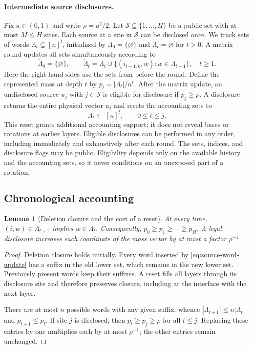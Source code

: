 \documentclass[11pt,letterpaper]{article}
\newtheorem{lemma}[theorem]{Lemma}
\theoremstyle{definition}
\theoremstyle{remark}
\begin{document}
\paragraph{Intermediate source disclosures.}
Fix $a\in(0,1)$ and write $\rho=a^2/2$.  Let
$\mathcal S\subseteq\{1,\ldots,H\}$ be a public set with at most
$M\leq H$ sites.  Each source at a site in $\mathcal S$ can be
disclosed once.  We track sets of words
$\Lambda_t\subseteq[n]^t$, initialized by
$\Lambda_0=\{\varnothing\}$ and $\Lambda_t=\varnothing$ for $t>0$.
A matrix round updates all sets simultaneously according to
\begin{equation}
  \widetilde\Lambda_0=\{\varnothing\},\qquad
  \widetilde\Lambda_t=
  \Lambda_t\cup
  \{(i_{t-1,k},w):w\in\Lambda_{t-1}\},\quad t\geq1.
  \label{eq:source-word-update}
\end{equation}
Here the right-hand sides use the sets from before the round.  Define
the represented mass at depth $t$ by
$p_t=|\Lambda_t|/n^t$.  After the matrix update, an undisclosed source
$u_j$ with $j\in\mathcal S$ is eligible for disclosure if $p_j\geq\rho$.
A disclosure returns the entire physical vector $u_j$ and resets
the accounting sets to
\begin{equation}
  \Lambda_t\leftarrow[n]^t,\qquad 0\leq t\leq j.
  \label{eq:source-reset}
\end{equation}
This reset grants additional accounting support; it does not reveal
bases or rotations at earlier layers.  Eligible disclosures can be
performed in any order, including immediately and exhaustively after
each round.  The sets, indices, and disclosure flags may be public.
Eligibility depends only on the available history and the accounting
sets, so it never conditions on an unexposed part of a rotation.

\subsection{Chronological accounting}
\label{app:source:counting}

\begin{lemma}[Deletion closure and the cost of a reset]
\label{lem:source-reset}
At every time, $(i,w)\in\Lambda_{t+1}$ implies
$w\in\Lambda_t$.  Consequently,
$p_0\geq p_1\geq\cdots\geq p_H$.
A legal disclosure increases each coordinate of the mass vector by
at most a factor $\rho^{-1}$.
\end{lemma}

\begin{proof}
Deletion closure holds initially.  Every word inserted by
\eqref{eq:source-word-update} has a suffix in the old lower set,
which remains in the new lower set.  Previously present words keep
their suffixes.  A reset fills all layers through its disclosure
site and therefore preserves closure, including at the interface
with the next layer.

There are at most $n$ possible words with any given suffix, whence
$|\Lambda_{t+1}|\leq n|\Lambda_t|$ and $p_{t+1}\leq p_t$.
If site $j$ is disclosed, then $p_t\geq p_j\geq\rho$ for all
$t\leq j$.  Replacing these entries by one multiplies each by at
most $\rho^{-1}$; the other entries remain unchanged.
\end{proof}
\end{document}
